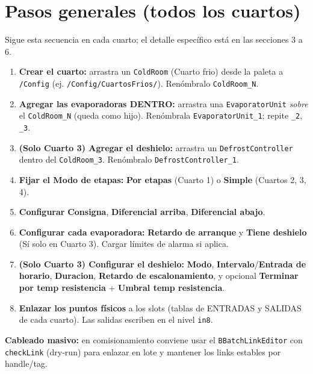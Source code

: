 \documentclass[11pt,a4paper]{article}
\newcommand{\slot}[1]{\textbf{#1}}
\newcommand{\code}[1]{\texttt{#1}}
\begin{document}
\section{Pasos generales (todos los cuartos)}
Sigue esta secuencia en cada cuarto; el detalle específico está en las secciones 3 a 6.

\begin{enumerate}[leftmargin=1.6em,itemsep=3pt]
  \item \textbf{Crear el cuarto:} arrastra un \code{ColdRoom} (Cuarto frio) desde la paleta a
        \code{/Config} (ej. \code{/Config/CuartosFrios/}). Renómbralo \code{ColdRoom_N}.
  \item \textbf{Agregar las evaporadoras DENTRO:} arrastra una \code{EvaporatorUnit} \emph{sobre}
        el \code{ColdRoom_N} (queda como hijo). Renómbrala \code{EvaporatorUnit_1}; repite \code{_2}, \code{_3}.
  \item \textbf{(Solo Cuarto 3) Agregar el deshielo:} arrastra un \code{DefrostController} dentro del
        \code{ColdRoom_3}. Renómbralo \code{DefrostController_1}.
  \item \textbf{Fijar el \slot{Modo de etapas}:} \textbf{Por etapas} (Cuarto 1) o \textbf{Simple} (Cuartos 2, 3, 4).
  \item \textbf{Configurar} \slot{Consigna}, \slot{Diferencial arriba}, \slot{Diferencial abajo}.
  \item \textbf{Configurar cada evaporadora:} \slot{Retardo de arranque} y \slot{Tiene deshielo}
        (Sí solo en Cuarto 3). Cargar límites de alarma si aplica.
  \item \textbf{(Solo Cuarto 3) Configurar el deshielo:} \slot{Modo}, \slot{Intervalo}/\slot{Entrada de horario},
        \slot{Duracion}, \slot{Retardo de escalonamiento}, y opcional \slot{Terminar por temp resistencia} + \slot{Umbral temp resistencia}.
  \item \textbf{Enlazar los puntos físicos} a los slots (tablas de ENTRADAS y SALIDAS de cada cuarto).
        Las salidas escriben en el nivel \code{in8}.
\end{enumerate}

\begin{nota}
\textbf{Cableado masivo:} en comisionamiento conviene usar el \code{BBatchLinkEditor} con \code{checkLink}
(dry-run) para enlazar en lote y mantener los links estables por handle/tag.
\end{nota}

\end{document}
